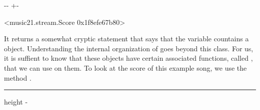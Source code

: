 \documentclass[letterpaper,10pt,english]{sphinxmanual}
\newlength\nbsphinxcodecellspacing
\begin{document}
{
\begin{sphinxVerbatim}[commandchars=\\\{\}]
\llap{\color{nbsphinxin}[8]:\,\hspace{\fboxrule}\hspace{\fboxsep}}
\end{sphinxVerbatim}
}

{

\kern-\sphinxverbatimsmallskipamount\kern-\baselineskip
\kern+\FrameHeightAdjust\kern-\fboxrule
\vspace{\nbsphinxcodecellspacing}

\begin{sphinxVerbatim}[commandchars=\\\{\}]
\llap{\color{nbsphinxout}[8]:\,\hspace{\fboxrule}\hspace{\fboxsep}}<music21.stream.Score 0x1f8efe67b80>
\end{sphinxVerbatim}
}

It returns a somewhat cryptic statement that says that the variable countains a  object. Understanding the internal organization of  goes beyond this class. For us, it is suffient to know that these objects have certain associated functions, called , that we can use on them. To look at the score of this example song, we use the method .

{
\begin{sphinxVerbatim}[commandchars=\\\{\}]
\llap{\color{nbsphinxin}[9]:\,\hspace{\fboxrule}\hspace{\fboxsep}}
\end{sphinxVerbatim}
}

\hrule height -\fboxrule\relax
\vspace{\nbsphinxcodecellspacing}

\makeatletter\setbox\nbsphinxpromptbox\box\voidb@x\makeatother
\end{document}
